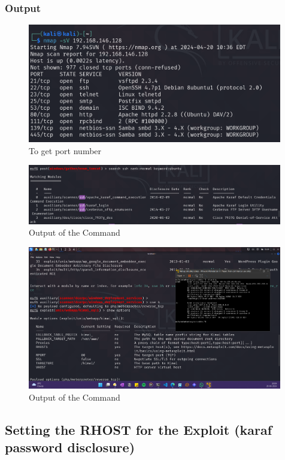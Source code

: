 \documentclass[11pt]{article}
\begin{document}
\subsubsection*{Output}
\begin{figure}[H]
    \centering
    \includegraphics[width=0.99\textwidth]{a3_ss (28).png}
    \caption{To get port number}
\end{figure}
\begin{figure}[H]
    \centering
    \includegraphics[width=0.99\textwidth]{a3_ss (29).png}
    \caption{Output of the Command}
\end{figure}
\begin{figure}[H]
    \centering
    \includegraphics[width=0.99\textwidth]{a3_ss (24).png}
    \caption{Output of the Command}
\end{figure}
\subsection{Setting the RHOST for the Exploit (karaf password disclosure)}
\end{document}
